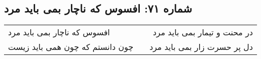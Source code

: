 \begin{center}
\section*{شماره ۷۱: افسوس که ناچار بمی باید مرد}
\label{sec:071}
\begin{longtable}{l p{0.5cm} r}
افسوس که ناچار بمی باید مرد
&&
در محنت و تیمار بمی باید مرد
\\
چون دانستم که چون همی باید زیست
&&
دل پر حسرت زار بمی باید مرد
\\
\end{longtable}
\end{center}
